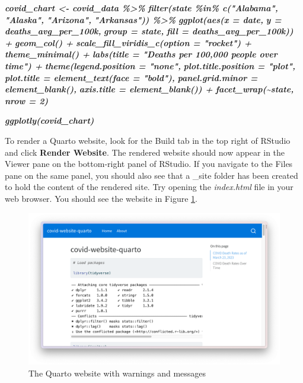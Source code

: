 \documentclass[
]{book}
\newenvironment{Shaded}{\begin{snugshade}}{\end{snugshade}}
\newcommand{\InformationTok}[1]{\textcolor[rgb]{0.56,0.35,0.01}{\textbf{\textit{#1}}}}
\begin{document}
\begin{Shaded}
\begin{Highlighting}[]
\InformationTok{covid\_chart \textless{}{-} covid\_data \%\textgreater{}\% }
\InformationTok{  filter(state \%in\% c("Alabama",}
\InformationTok{                      "Alaska",}
\InformationTok{                      "Arizona",}
\InformationTok{                      "Arkansas")) \%\textgreater{}\% }
\InformationTok{  ggplot(aes(x = date,}
\InformationTok{             y = deaths\_avg\_per\_100k,}
\InformationTok{             group = state,}
\InformationTok{             fill = deaths\_avg\_per\_100k)) +}
\InformationTok{  geom\_col() +}
\InformationTok{  scale\_fill\_viridis\_c(option = "rocket") +}
\InformationTok{  theme\_minimal() +}
\InformationTok{  labs(title = "Deaths per 100,000 people over time") +}
\InformationTok{  theme(legend.position = "none",}
\InformationTok{        plot.title.position = "plot",}
\InformationTok{        plot.title = element\_text(face = "bold"),}
\InformationTok{        panel.grid.minor = element\_blank(),}
\InformationTok{        axis.title = element\_blank()) +}
\InformationTok{  facet\_wrap(\textasciitilde{}state,}
\InformationTok{             nrow = 2)}


\InformationTok{ggplotly(covid\_chart)}
\InformationTok{\textasciigrave{}\textasciigrave{}\textasciigrave{}}
\end{Highlighting}
\end{Shaded}

To render a Quarto website, look for the Build tab in the top right of RStudio and click \textbf{Render Website}. The rendered website should now appear in the Viewer pane on the bottom-right panel of RStudio. If you navigate to the Files pane on the same panel, you should also see that a \_site folder has been created to hold the content of the rendered site. Try opening the \emph{index.html} file in your web browser. You should see the website in Figure \ref{fig:covid-website-messages}.

\begin{figure}
\includegraphics[width=1\linewidth]{assets/covid-website-messages} \caption{The Quarto website with warnings and messages}\label{fig:covid-website-messages}
\end{figure}
\end{document}
